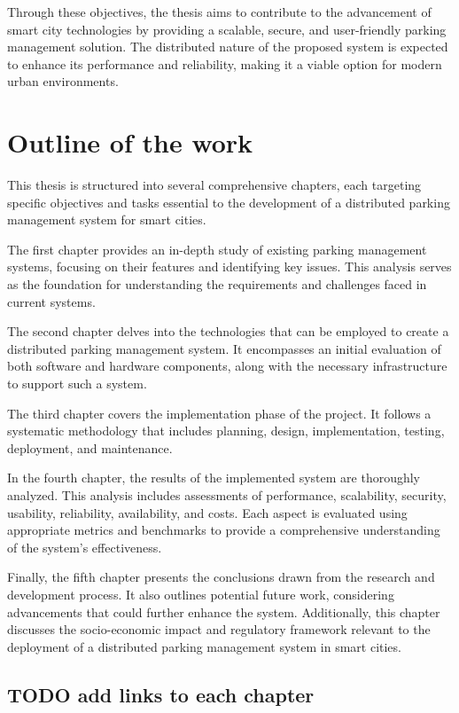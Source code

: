 \documentclass[oneside, 12pt, a4paper, draft]{book}
\begin{document}
Through these objectives, the thesis aims to contribute to the advancement of smart city technologies by providing a scalable, secure, and user-friendly parking management solution. The distributed nature of the proposed system is expected to enhance its performance and reliability, making it a viable option for modern urban environments.
\chapter{Outline of the work}
\label{sec:orgf3808bf}
This thesis is structured into several comprehensive chapters, each targeting specific objectives and tasks essential to the development of a distributed parking management system for smart cities.

The first chapter provides an in-depth study of existing parking management systems, focusing on their features and identifying key issues. This analysis serves as the foundation for understanding the requirements and challenges faced in current systems.

The second chapter delves into the technologies that can be employed to create a distributed parking management system. It encompasses an initial evaluation of both software and hardware components, along with the necessary infrastructure to support such a system.

The third chapter covers the implementation phase of the project. It follows a systematic methodology that includes planning, design, implementation, testing, deployment, and maintenance.

In the fourth chapter, the results of the implemented system are thoroughly analyzed. This analysis includes assessments of performance, scalability, security, usability, reliability, availability, and costs. Each aspect is evaluated using appropriate metrics and benchmarks to provide a comprehensive understanding of the system's effectiveness.

Finally, the fifth chapter presents the conclusions drawn from the research and development process. It also outlines potential future work, considering advancements that could further enhance the system. Additionally, this chapter discusses the socio-economic impact and regulatory framework relevant to the deployment of a distributed parking management system in smart cities.
\section{{\bfseries\sffamily TODO} add links to each chapter}
\label{sec:orgfd76766}
\end{document}
